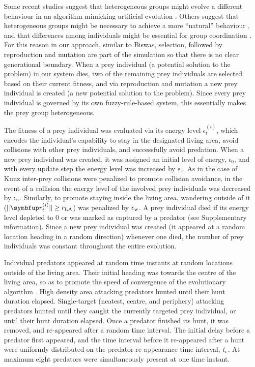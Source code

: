 Some recent studies suggest that heterogeneous groups might evolve a different behaviour in an algorithm mimicking artificial evolution \cite{olson2015exploring}. Others suggest that heterogeneous groups might be necessary to achieve a more ``natural'' behaviour \cite{demsar2013family}, and that differences among individuals might be essential for group coordination \cite{marras2012information,marras2013schooling}. For this reason in our approach, similar to Biswas\etal \cite{biswas2014causes}, selection, followed by reproduction and mutation are part of the simulation so that there is no clear generational boundary. When a prey individual (a potential solution to the problem) in our system dies, two of the remaining prey individuals are selected based on their current fitness, and via reproduction and mutation a new prey individual is created (a new potential solution to the problem). Since every prey individual is governed by its own fuzzy-rule-based system, this essentially makes the prey group heterogeneous.

The fitness of a prey individual was evaluated via its energy level $\epsilon^{(i)}_t$, which encodes the individual's capability to stay in the designated living area, avoid collisions with other prey individuals, and successfully avoid predation. When a new prey individual was created, it was assigned an initial level of energy, $\epsilon_0$, and with every update step the energy level was increased by $\epsilon_\textnormal{l}$. As in the case of Kunz\etal \cite{kunz2006prey} inter-prey collisions were penalized to promote collision avoidance, \ie in the event of a collision the energy level of the involved prey individuals was decreased by $\epsilon_\textnormal{c}$. Similarly, to promote staying inside the living area, wandering outside of it (\ie $\|\vec{r}^{(i)}_t\| \geq r_\textnormal{LA}$) was penalized by $\epsilon_\textnormal{w}$. A prey individual died if its energy level depleted to 0 or was marked as captured by a predator (see Supplementary information). Since a new prey individual was created (\ie it appeared at a random location heading in a random direction) whenever one died, the number of prey individuals was constant throughout the entire evolution.

Individual predators appeared at random time instants at random locations outside of the living area. Their initial heading was towards the centre of the living area, so as to promote the speed of convergence of the evolutionary algorithm \cite{olson2016evolution}. High density area attacking predators hunted until their hunt duration elapsed. Single-target (neatest, centre, and periphery) attacking predators hunted until they caught the currently targeted prey individual, or until their hunt duration elapsed. Once a predator finished its hunt, it was removed, and re-appeared after a random time interval. The initial delay before a predator first appeared, and the time interval before it re-appeared after a hunt were uniformly distributed on the predator re-appearance time interval, $t_\textnormal{r}$. At maximum eight predators were simultaneously present at one time instant.

